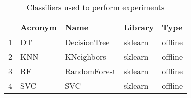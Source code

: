 \begin{table}
\footnotesize
\caption{Classifiers used to perform experiments}
\label{tab:algorithm}
\begin{tabular}{lllll}
\hline
 & Acronym & Name & Library & Type \\
\hline
1 & DT & DecisionTree & sklearn & offline \\
2 & KNN & KNeighbors & sklearn & offline \\
3 & RF & RandomForest & sklearn & offline \\
4 & SVC & SVC & sklearn & offline \\
\hline
\end{tabular}
\end{table}
